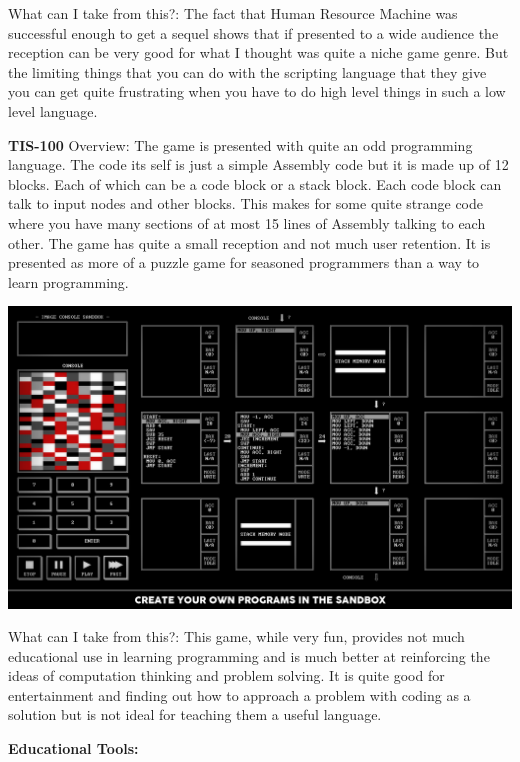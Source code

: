 \documentclass[12pt]{article}
\begin{document}
What can I take from this?:\newline
The fact that Human Resource Machine was successful enough to get a sequel shows that if presented to a wide audience the reception can be very good for what I thought was quite a niche game genre. But the limiting things that you can do with the scripting language that they give you can get quite frustrating when you have to do high level things in such a low level language.

\textbf{TIS-100}\newline
Overview:\newline
The game is presented with quite an odd programming language. The code its self is just a simple Assembly code but it is made up of 12 blocks. Each of which can be a code block or a stack block. Each code block can talk to input nodes and other blocks. This makes for some quite strange code where you have many sections of at most 15 lines of Assembly talking to each other. The game has quite a small reception and not much user retention. It is presented as more of a puzzle game for seasoned programmers than a way to learn programming.

{\centering
\includegraphics[width=15cm]{Images/tis-100.jpg}\par
}

What can I take from this?:\newline
This game, while very fun, provides not much educational use in learning programming and is much better at reinforcing the ideas of computation thinking and problem solving. It is quite good for entertainment and finding out how to approach a problem with coding as a solution but is not ideal for teaching them a useful language.

\textbf{Educational Tools:}
\end{document}
